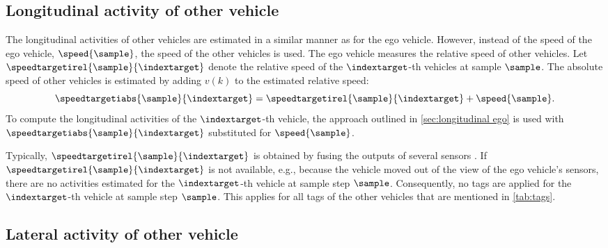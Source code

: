 \subsection{Longitudinal activity of other vehicle}
\label{sec:longitudinal other vehicles}

The longitudinal activities of other vehicles are estimated in a similar manner as for the ego vehicle. However, instead of the speed of the ego vehicle, $\speed{\sample}$, the speed of the other vehicles is used. The ego vehicle measures the relative speed of other vehicles. Let $\speedtargetirel{\sample}{\indextarget}$ denote the relative speed of the $\indextarget$-th vehicles at sample $\sample$. The absolute speed of other vehicles is estimated by adding $v(k)$ to the estimated relative speed:
\begin{equation}
	\speedtargetiabs{\sample}{\indextarget} = \speedtargetirel{\sample}{\indextarget} + \speed{\sample}.
\end{equation}
To compute the longitudinal activities of the $\indextarget$-th vehicle, the approach outlined in \cref{sec:longitudinal ego} is used with $\speedtargetiabs{\sample}{\indextarget}$ substituted for $\speed{\sample}$. 

\begin{remark}
	\label{rem:no target}
	\cstarta Typically, $\speedtargetirel{\sample}{\indextarget}$ is obtained by fusing the outputs of several sensors \autocite{elfring2016effective}. 
	If $\speedtargetirel{\sample}{\indextarget}$ is not available, e.g., because the vehicle moved out of the view of the ego vehicle's sensors, there are no activities estimated for the $\indextarget$-th vehicle at sample step $\sample$. \cenda
	\cstartc Consequently, no tags are applied for the $\indextarget$-th vehicle at sample step $\sample$. This applies for all tags of the other vehicles that are mentioned in \cref{tab:tags}.\cendc
\end{remark}



\subsection{Lateral activity of other vehicle}
\label{sec:lateral other vehicles}

